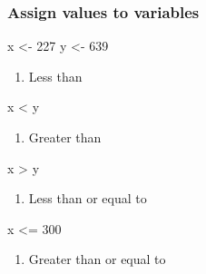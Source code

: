 \documentclass[
  letterpaper,
  DIV=11,
  numbers=noendperiod]{scrreprt}
\newenvironment{Shaded}{}{}
\newcommand{\DecValTok}[1]{\textcolor[rgb]{0.00,0.36,0.77}{#1}}
\newcommand{\NormalTok}[1]{\textcolor[rgb]{0.14,0.16,0.18}{#1}}
\newcommand{\OtherTok}[1]{\textcolor[rgb]{0.44,0.26,0.76}{#1}}
\newcommand{\SpecialCharTok}[1]{\textcolor[rgb]{0.00,0.36,0.77}{#1}}
\providecommand{\tightlist}{%
  \setlength{\itemsep}{0pt}\setlength{\parskip}{0pt}}\usepackage{longtable,booktabs,array}
\begin{document}
\subsubsection{Assign values to
variables}\label{assign-values-to-variables}

\begin{Shaded}
\begin{Highlighting}[]
\NormalTok{x }\OtherTok{\textless{}{-}} \DecValTok{227}
\NormalTok{y }\OtherTok{\textless{}{-}} \DecValTok{639}
\end{Highlighting}
\end{Shaded}

\begin{enumerate}
\def\labelenumi{\alph{enumi}.}
\tightlist
\item
  Less than
\end{enumerate}

\begin{Shaded}
\begin{Highlighting}[]
\NormalTok{x }\SpecialCharTok{\textless{}}\NormalTok{ y}
\end{Highlighting}
\end{Shaded}

\begin{enumerate}
\def\labelenumi{\alph{enumi}.}
\setcounter{enumi}{1}
\tightlist
\item
  Greater than
\end{enumerate}

\begin{Shaded}
\begin{Highlighting}[]
\NormalTok{x }\SpecialCharTok{\textgreater{}}\NormalTok{ y}
\end{Highlighting}
\end{Shaded}

\begin{enumerate}
\def\labelenumi{\alph{enumi}.}
\setcounter{enumi}{2}
\tightlist
\item
  Less than or equal to
\end{enumerate}

\begin{Shaded}
\begin{Highlighting}[]
\NormalTok{x }\SpecialCharTok{\textless{}=} \DecValTok{300}
\end{Highlighting}
\end{Shaded}

\begin{enumerate}
\def\labelenumi{\alph{enumi}.}
\setcounter{enumi}{3}
\tightlist
\item
  Greater than or equal to
\end{enumerate}
\end{document}
